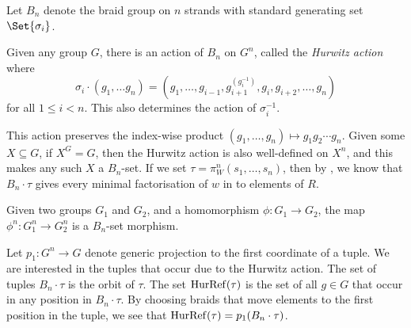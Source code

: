 Let  $B_n$ denote the braid group on  $n$ strands with standard generating set $\Set{\sigma_i}$.
\begin{definition}
	Given any group $G$, there is an action of  $B_n$ on  $G^n$, called the \emph{Hurwitz action} where
	\[
		\sigma_i \cdot  \left( g_1, \ldots g_n \right) = \left( g_1,\ldots,g_{i-1}, g_{i+1}^{\left(g_i^{-1}\right)}, g_{i}, g_{i+2}, \ldots, g_n \right)
	\]
	for all $1\leq i<n$.
	This also determines the action of $\sigma_i^{-1}$.
\end{definition}
This action preserves the index-wise product $(g_1, \ldots, g_n) \mapsto g_1g_2\cdots g_n$.
Given some $X \subseteq G$, if $X^G = G$, then the Hurwitz action is also well-defined on $X^n$, and this makes any such $X$ a  $B_n$-set.
If we set $\tau = \pi^n_W(s_1,\ldots,s_n)$, then by \cite{igusa_schiffler_exceptional_2010}, we know that $B_n \cdot \tau$ gives every minimal factorisation of  $w$ in to elements of $R$.

\begin{remark}
	\label{rmk:hurwitz_action_Bn_set_morphism}
	Given two groups $G_1$ and  $G_2$, and a homomorphism $\phi \colon G_1 \to G_2$, the map $\phi^n \colon G_1^n \to G_2^n$ is a  $B_n$-set morphism.
\end{remark}
Let $p_1 \colon G^n \to G$ denote generic projection to the first coordinate of a tuple.
We are interested in the tuples that occur due to the Hurwitz action.
The set of tuples $B_n \cdot \tau$ is the orbit of $\tau$.
The set $\operatorname{HurRef}(\tau)$ is the set of all  $g \in G$ that occur in any position in  $B_n \cdot \tau$.
By choosing braids that move elements to the first position in the tuple, we see that $\operatorname{HurRef}(\tau) = p_1(B_n \cdot \tau)$.

